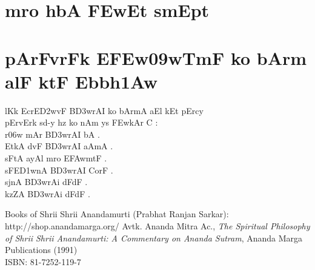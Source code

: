 \documentclass[12pt]{book}
\begin{document}
\frontmatter
%
\chapter*{\large {} }
\thispagestyle{empty}
\section*{\huge {}}
\newpage
%
\chapter*{\center \normalsize  {\dn m\?ro h\0bA \3FEwEt smEp\0t}}
%
%
\mainmatter
%
\chapter{ {\dn pArFvrFk E\3FEw\309wTmF ko bAr\?m alF ktF Ebbh\31Aw}}
 {\dn l\?Kk EcrE\3D2wvF B\3D3wrAI ko bAr\?mA aEl kEt pErcy\\
pErvErk sd-y hz ko nAm ys \3FEwkAr C {\rs :\re} \\
r\?\306w mAr B\3D3wrAI bA .\\
EtkA d\?vF B\3D3wrAI aAmA . \\
sFtA ayA\0l m\?ro E\3FAwmtF . \\
sFE\3D1wnA B\3D3wrAI CorF . \\
sjnA B\3D3wrAi dFdF . \\
kzZA B\3D3wrAi dFdF . \\
}
%
\backmatter
%
\begin{thebibliography}{99}
Books of Shrii Shrii Anandamurti (Prabhat Ranjan Sarkar): \\
http://shop.anandamarga.org/
Avtk. Ananda Mitra Ac., \emph{The Spiritual Philosophy of Shrii Shrii Anandamurti: A Commentary on Ananda Sutram}, Ananda Marga Publications (1991) \\
ISBN: 81-7252-119-7
\end{thebibliography}
\end{document}
